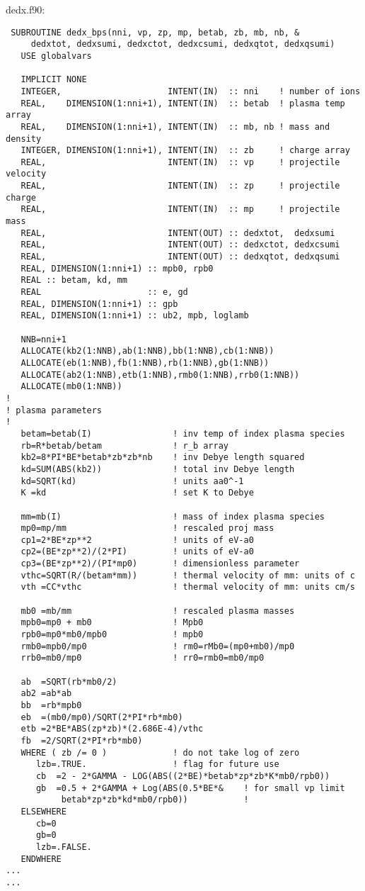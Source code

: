 \documentclass[preprint,12pt,eqsecnum,nofootinbib,amsmath,amssymb]{revtex4}
\begin{document}
\vskip-0.1cm 
{
\noindent
dedx.f90:
\baselineskip12pt
\begin{verbatim}
 SUBROUTINE dedx_bps(nni, vp, zp, mp, betab, zb, mb, nb, &
     dedxtot, dedxsumi, dedxctot, dedxcsumi, dedxqtot, dedxqsumi)
   USE globalvars

   IMPLICIT NONE
   INTEGER,                     INTENT(IN)  :: nni    ! number of ions
   REAL,    DIMENSION(1:nni+1), INTENT(IN)  :: betab  ! plasma temp array
   REAL,    DIMENSION(1:nni+1), INTENT(IN)  :: mb, nb ! mass and density 
   INTEGER, DIMENSION(1:nni+1), INTENT(IN)  :: zb     ! charge array
   REAL,                        INTENT(IN)  :: vp     ! projectile velocity
   REAL,                        INTENT(IN)  :: zp     ! projectile charge
   REAL,                        INTENT(IN)  :: mp     ! projectile mass
   REAL,                        INTENT(OUT) :: dedxtot,  dedxsumi
   REAL,                        INTENT(OUT) :: dedxctot, dedxcsumi
   REAL,                        INTENT(OUT) :: dedxqtot, dedxqsumi
   REAL, DIMENSION(1:nni+1) :: mpb0, rpb0
   REAL :: betam, kd, mm
   REAL                     :: e, gd
   REAL, DIMENSION(1:nni+1) :: gpb
   REAL, DIMENSION(1:nni+1) :: ub2, mpb, loglamb

   NNB=nni+1
   ALLOCATE(kb2(1:NNB),ab(1:NNB),bb(1:NNB),cb(1:NNB))
   ALLOCATE(eb(1:NNB),fb(1:NNB),rb(1:NNB),gb(1:NNB))
   ALLOCATE(ab2(1:NNB),etb(1:NNB),rmb0(1:NNB),rrb0(1:NNB))
   ALLOCATE(mb0(1:NNB))
!
! plasma parameters
!
   betam=betab(I)                ! inv temp of index plasma species
   rb=R*betab/betam              ! r_b array
   kb2=8*PI*BE*betab*zb*zb*nb    ! inv Debye length squared
   kd=SUM(ABS(kb2))              ! total inv Debye length
   kd=SQRT(kd)                   ! units aa0^-1
   K =kd                         ! set K to Debye 

   mm=mb(I)                      ! mass of index plasma species  
   mp0=mp/mm                     ! rescaled proj mass
   cp1=2*BE*zp**2                ! units of eV-a0 
   cp2=(BE*zp**2)/(2*PI)         ! units of eV-a0 
   cp3=(BE*zp**2)/(PI*mp0)       ! dimensionless parameter   
   vthc=SQRT(R/(betam*mm))       ! thermal velocity of mm: units of c
   vth =CC*vthc                  ! thermal velocity of mm: units cm/s 

   mb0 =mb/mm                    ! rescaled plasma masses
   mpb0=mp0 + mb0                ! Mpb0
   rpb0=mp0*mb0/mpb0             ! mpb0
   rmb0=mpb0/mp0                 ! rm0=rMb0=(mp0+mb0)/mp0
   rrb0=mb0/mp0                  ! rr0=rmb0=mb0/mp0

   ab  =SQRT(rb*mb0/2)            
   ab2 =ab*ab                    
   bb  =rb*mpb0                   
   eb  =(mb0/mp0)/SQRT(2*PI*rb*mb0)
   etb =2*BE*ABS(zp*zb)*(2.686E-4)/vthc
   fb  =2/SQRT(2*PI*rb*mb0)
   WHERE ( zb /= 0 )             ! do not take log of zero
      lzb=.TRUE.                 ! flag for future use
      cb  =2 - 2*GAMMA - LOG(ABS((2*BE)*betab*zp*zb*K*mb0/rpb0))
      gb  =0.5 + 2*GAMMA + Log(ABS(0.5*BE*&    ! for small vp limit
           betab*zp*zb*kd*mb0/rpb0))           !
   ELSEWHERE
      cb=0
      gb=0
      lzb=.FALSE.
   ENDWHERE
...
...
\end{verbatim}
}
\end{document}
